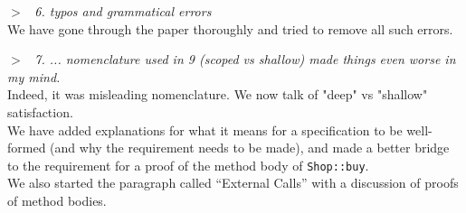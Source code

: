 \documentclass{article}
\newcommand{\pair}[2]{\noindent $>$\  \emph{#1}   \\ {#2}\\ \vspace{.1pt}}
\begin{document}
\pair{ 6. typos and grammatical errors}
{We have gone through the paper thoroughly and tried to remove all such errors.}

\pair{
7. ...  nomenclature used in 9 (scoped vs shallow) made things even worse in my mind.}
{Indeed, it was misleading nomenclature. We now talk of "deep" vs "shallow" satisfaction.\\
We have added explanations for what it means for a specification to be well-formed (and why the requirement needs to be made), and made a better bridge to the requirement for a proof of the method body of \texttt{Shop::buy}.\\
We also started the paragraph called “External Calls” with a discussion of proofs of method bodies.}

 
\end{document}
